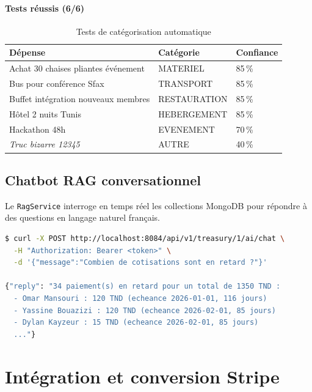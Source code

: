 \documentclass[11pt,a4paper]{article}
\begin{document}
\paragraph{Tests réussis (6/6)}

\begin{table}[h]
  \centering
  \small
  \begin{tabularx}{\linewidth}{Xll}
    \toprule
    \textbf{Dépense} & \textbf{Catégorie} & \textbf{Confiance} \\
    \midrule
    Achat 30 chaises pliantes événement   & MATERIEL       & 85\,\% \\
    Bus pour conférence Sfax              & TRANSPORT      & 85\,\% \\
    Buffet intégration nouveaux membres   & RESTAURATION   & 85\,\% \\
    Hôtel 2 nuits Tunis                   & HEBERGEMENT    & 85\,\% \\
    Hackathon 48h                         & EVENEMENT      & 70\,\% \\
    \emph{Truc bizarre 12345}             & AUTRE          & 40\,\% \\
    \bottomrule
  \end{tabularx}
  \caption{Tests de catégorisation automatique}
\end{table}

\subsection{Chatbot RAG conversationnel}

Le \texttt{RagService} interroge en temps réel les collections MongoDB pour répondre à des questions en langage naturel français.

\begin{lstlisting}[language=bash, caption={Exemple de requête au chatbot}]
$ curl -X POST http://localhost:8084/api/v1/treasury/1/ai/chat \
  -H "Authorization: Bearer <token>" \
  -d '{"message":"Combien de cotisations sont en retard ?"}'

{"reply": "34 paiement(s) en retard pour un total de 1350 TND :
  - Omar Mansouri : 120 TND (echeance 2026-01-01, 116 jours)
  - Yassine Bouazizi : 120 TND (echeance 2026-02-01, 85 jours)
  - Dylan Kayzeur : 15 TND (echeance 2026-02-01, 85 jours)
  ..."}
\end{lstlisting}

\section{Intégration et conversion Stripe}
\end{document}

